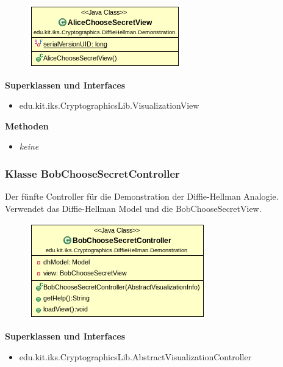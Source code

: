 \documentclass{article}
\begin{document}
      \begin{figure}[H]
        \centering
        \includegraphics{resources/edu-kit-iks-Cryptographics-DiffieHellman-Demonstration-AliceChooseSecretView}
      \end{figure}

      \textbf{Superklassen und Interfaces}
      \begin{itemize}
        \item edu.kit.iks.CryptographicsLib.VisualizationView
      \end{itemize}

      \textbf{Methoden}
      \begin{itemize}
        \item \textit{keine}
      \end{itemize}

\subsubsection{Klasse BobChooseSecretController}
      Der fünfte Controller für die Demonstration der Diffie-Hellman Analogie.
      Verwendet das Diffie-Hellman Model und die BobChooseSecretView.

      \begin{figure}[H]
        \centering
        \includegraphics{resources/edu-kit-iks-Cryptographics-DiffieHellman-Demonstration-BobChooseSecretController}
      \end{figure}

      \textbf{Superklassen und Interfaces}
      \begin{itemize}
        \item edu.kit.iks.CryptographicsLib.AbstractVisualizationController
      \end{itemize}
\end{document}
